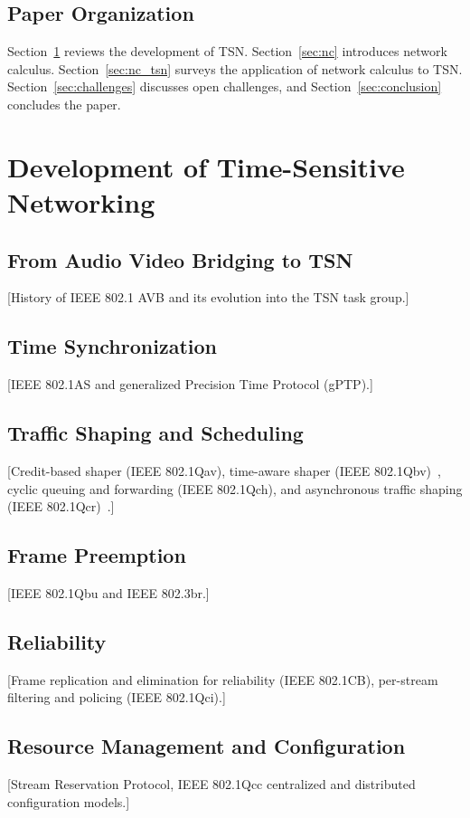 \documentclass[journal]{IEEEtran}
\begin{document}
\subsection{Paper Organization}
Section~\ref{sec:tsn} reviews the development of TSN. Section~\ref{sec:nc} introduces network calculus. Section~\ref{sec:nc_tsn} surveys the application of network calculus to TSN. Section~\ref{sec:challenges} discusses open challenges, and Section~\ref{sec:conclusion} concludes the paper.


\section{Development of Time-Sensitive Networking}
\label{sec:tsn}

\subsection{From Audio Video Bridging to TSN}
[History of IEEE 802.1 AVB and its evolution into the TSN task group.]

\subsection{Time Synchronization}
[IEEE 802.1AS and generalized Precision Time Protocol (gPTP).]

\subsection{Traffic Shaping and Scheduling}
[Credit-based shaper (IEEE 802.1Qav), time-aware shaper (IEEE 802.1Qbv)~\cite{ieee8021qbv}, cyclic queuing and forwarding (IEEE 802.1Qch), and asynchronous traffic shaping (IEEE 802.1Qcr)~\cite{specht2016ubs}.]

\subsection{Frame Preemption}
[IEEE 802.1Qbu and IEEE 802.3br.]

\subsection{Reliability}
[Frame replication and elimination for reliability (IEEE 802.1CB), per-stream filtering and policing (IEEE 802.1Qci).]

\subsection{Resource Management and Configuration}
[Stream Reservation Protocol, IEEE 802.1Qcc centralized and distributed configuration models.]
\end{document}
